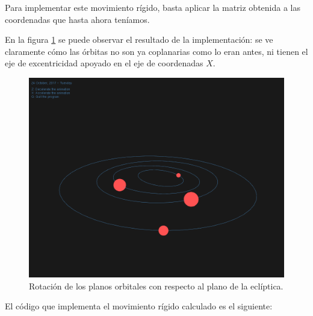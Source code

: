 \documentclass[a4paper, 11pt]{article}
\begin{document}
  Para implementar este movimiento rígido, basta aplicar la matriz obtenida a las coordenadas que hasta ahora teníamos.

  En la figura \ref{fig_ani} se puede observar el resultado de la implementación: se ve claramente cómo las órbitas no son ya coplanarias como lo eran antes, ni tienen el eje de excentricidad apoyado en el eje de coordenadas $X$.

  \begin{figure}[ht!]
      \centering
      \includegraphics[width=140mm]{./screenshot_ANI.png}
      \caption{Rotación de los planos orbitales con respecto al plano de la eclíptica.\label{fig_ani}}
  \end{figure}

   El código que implementa el movimiento rígido calculado es el siguiente:
\end{document}
